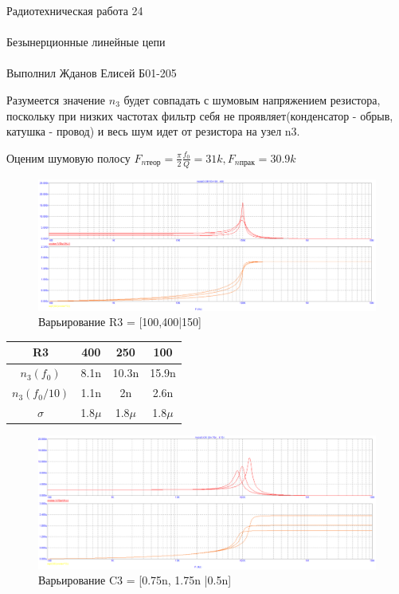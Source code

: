 \documentclass{astroedu-lab}
\begin{document}
\begin{problem}{\huge Радиотехническая работа 24\\\\Безынерционные линейные цепи\\\\Выполнил Жданов Елисей Б01-205}
\begin{enumerate}
Разумеется значение $n_3$ будет совпадать с шумовым напряжением резистора, поскольку при низких частотах фильтр себя не проявляет(конденсатор - обрыв, катушка - провод) и весь шум идет от резистора на узел n3.

Оценим шумовую полосу $F_{n\text{теор}} = \frac{\pi}{2}\frac{f_0}{Q} = 31k, F_{n\text{прак}} = 30.9k$

\begin{figure}[h!]
    \centering
    \includegraphics[scale=0.3]{images/mod3_3_2_1.png}
    \caption{Варьирование R3 = [100,400|150]}
    \label{fig:m3321}
\end{figure}

\begin{center}
\begin{tabular}{|c|c|c|c|}
\hline
    R3 & 400 & 250 & 100\\ \hline
    $n_3(f_0)$ & 8.1n & 10.3n & 15.9n\\ \hline
    $n_3(f_0/10)$ & 1.1n & 2n & 2.6n\\ \hline
    $\sigma$ & 1.8$\mu$ & 1.8$\mu$ & 1.8$\mu$\\ \hline
\end{tabular}
\end{center}

\newpage

\begin{figure}[h!]
    \centering
    \includegraphics[scale=0.3]{images/mod3_3_2_2.png}
    \caption{Варьирование C3 = [0.75n, 1.75n |0.5n]}
    \label{fig:m3322}
\end{figure}


\end{enumerate}
\end{problem}
\end{document}
